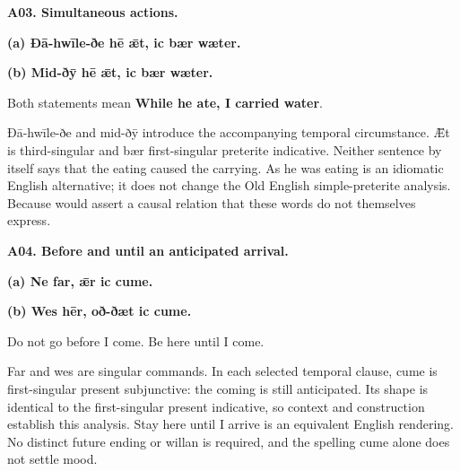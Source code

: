 \par\begin{minipage}{\linewidth}\raggedright
\textbf{A03. Simultaneous actions.}

\textbf{(a) Ðā-hwīle-ðe hē ǣt, ic bær wæter.}

\textbf{(b) Mid-ðȳ hē ǣt, ic bær wæter.}

Both statements mean \textbf{While he ate, I carried water}.

Ðā-hwīle-ðe and mid-ðȳ introduce the accompanying temporal circumstance. Ǣt is third-singular and bær first-singular preterite indicative. Neither sentence by itself says that the eating caused the carrying. As he was eating is an idiomatic English alternative; it does not change the Old English simple-preterite analysis. Because would assert a causal relation that these words do not themselves express.

\end{minipage}\par\addvspace{4pt}

\par\begin{minipage}{\linewidth}\raggedright
\textbf{A04. Before and until an anticipated arrival.}

\textbf{(a) Ne far, ǣr ic cume.}

\textbf{(b) Wes hēr, oð-ðæt ic cume.}

Do not go before I come. Be here until I come.

Far and wes are singular commands. In each selected temporal clause, cume is first-singular present subjunctive: the coming is still anticipated. Its shape is identical to the first-singular present indicative, so context and construction establish this analysis. Stay here until I arrive is an equivalent English rendering. No distinct future ending or willan is required, and the spelling cume alone does not settle mood.

\end{minipage}\par\addvspace{4pt}

